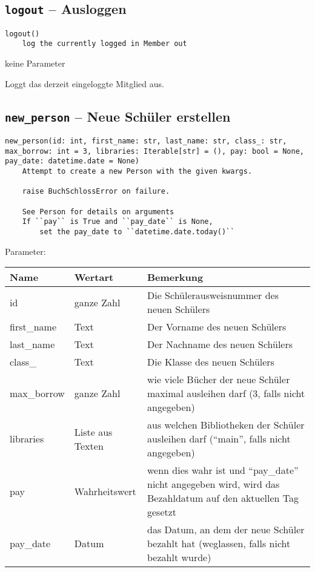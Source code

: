\subsection{\texttt{logout} -- Ausloggen}
\label{subsec:command_list:logout}

\begin{verbatim}
logout()
    log the currently logged in Member out
\end{verbatim}

keine Parameter

Loggt das derzeit eingeloggte Mitglied aus.

\subsection{\texttt{new\_person} -- Neue Schüler erstellen}
\label{subsec:command_list:new_person}

\begin{verbatim}
new_person(id: int, first_name: str, last_name: str, class_: str, 
max_borrow: int = 3, libraries: Iterable[str] = (), pay: bool = None, 
pay_date: datetime.date = None)
    Attempt to create a new Person with the given kwargs.

    raise BuchSchlossError on failure.

    See Person for details on arguments
    If ``pay`` is True and ``pay_date`` is None,
        set the pay_date to ``datetime.date.today()``
\end{verbatim}

Parameter:

\begin{tabular}{|p{}|p{}|p{}|}
Name & Wertart & Bemerkung\\
\hline
id & ganze Zahl & Die Schülerausweisnummer des neuen Schülers \\
first\_name & Text & Der Vorname des neuen Schülers  \\
last\_name & Text & Der Nachname des neuen Schülers \\
class\_ & Text & Die Klasse des neuen Schülers \\
max\_borrow & ganze Zahl &  wie viele Bücher der neue Schüler maximal ausleihen darf (3, falls nicht angegeben) \\
libraries & Liste aus Texten & aus welchen Bibliotheken der Schüler ausleihen darf (``main'', falls nicht angegeben) \\
pay & Wahrheitswert & wenn dies wahr ist und ``pay\_date'' nicht angegeben wird, wird das Bezahldatum auf den aktuellen Tag gesetzt \\
pay\_date & Datum & das Datum, an dem der neue Schüler bezahlt hat (weglassen, falls nicht bezahlt wurde) 
\end{tabular}

